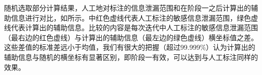 {	%
	随机选取部分计算结果，人工地对标注的信息泄漏范围和在阶段一之后计算出的辅助信息进行对比，如所示。中红色虚线代表人工标注的敏感信息泄漏范围，绿色虚线代表计算出的辅助信息。比较的内容是每次迭代中人工标注的敏感信息泄漏范围（最右边的红色虚线）与计算出的辅助信息（最左边的绿色虚线）横坐标值之差。这些差值的标准差远小于均值，我们有很大的把握（超过99.999\%）认为计算出的辅助信息与随机的横坐标有显著区别，即阶段一有效，可以达到与人工标注同样的效果。
	
}
